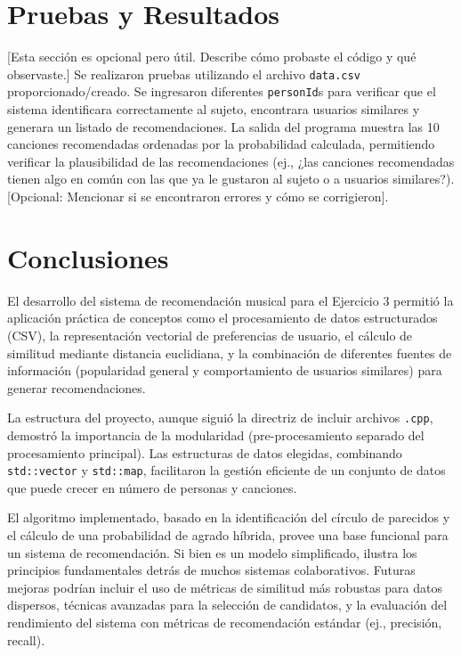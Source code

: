 \documentclass{article}
\begin{document}
\section{Pruebas y Resultados}

[Esta sección es opcional pero útil. Describe cómo probaste el código y qué observaste.]
Se realizaron pruebas utilizando el archivo \texttt{data.csv} proporcionado/creado. Se ingresaron diferentes \texttt{personId}s para verificar que el sistema identificara correctamente al sujeto, encontrara usuarios similares y generara un listado de recomendaciones. La salida del programa muestra las 10 canciones recomendadas ordenadas por la probabilidad calculada, permitiendo verificar la plausibilidad de las recomendaciones (ej., ¿las canciones recomendadas tienen algo en común con las que ya le gustaron al sujeto o a usuarios similares?). [Opcional: Mencionar si se encontraron errores y cómo se corrigieron].

\section{Conclusiones}

El desarrollo del sistema de recomendación musical para el Ejercicio 3 permitió la aplicación práctica de conceptos como el procesamiento de datos estructurados (CSV), la representación vectorial de preferencias de usuario, el cálculo de similitud mediante distancia euclidiana, y la combinación de diferentes fuentes de información (popularidad general y comportamiento de usuarios similares) para generar recomendaciones.

La estructura del proyecto, aunque siguió la directriz de incluir archivos \texttt{.cpp}, demostró la importancia de la modularidad (pre-procesamiento separado del procesamiento principal). Las estructuras de datos elegidas, combinando \texttt{std::vector} y \texttt{std::map}, facilitaron la gestión eficiente de un conjunto de datos que puede crecer en número de personas y canciones.

El algoritmo implementado, basado en la identificación del círculo de parecidos y el cálculo de una probabilidad de agrado híbrida, provee una base funcional para un sistema de recomendación. Si bien es un modelo simplificado, ilustra los principios fundamentales detrás de muchos sistemas colaborativos. Futuras mejoras podrían incluir el uso de métricas de similitud más robustas para datos dispersos, técnicas avanzadas para la selección de candidatos, y la evaluación del rendimiento del sistema con métricas de recomendación estándar (ej., precisión, recall).
\end{document}
